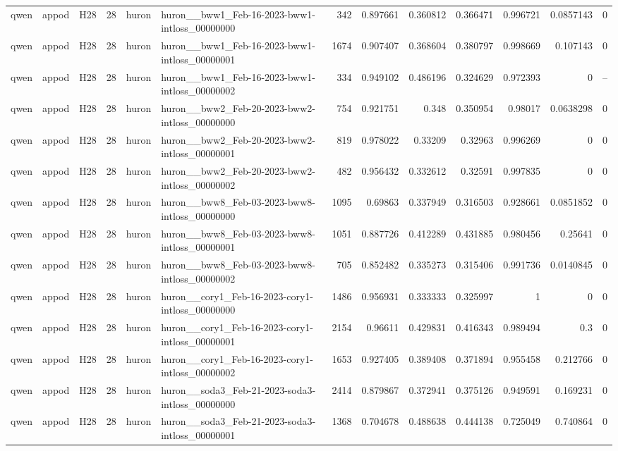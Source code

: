 \begin{longtable}{lllrllrrrrrrr}
qwen & appod & H28 & 28 & huron & huron\_\_bww1\_Feb-16-2023-bww1-intloss\_00000000 & 342 & 0.897661 & 0.360812 & 0.366471 & 0.996721 & 0.0857143 & 0 \\
qwen & appod & H28 & 28 & huron & huron\_\_bww1\_Feb-16-2023-bww1-intloss\_00000001 & 1674 & 0.907407 & 0.368604 & 0.380797 & 0.998669 & 0.107143 & 0 \\
qwen & appod & H28 & 28 & huron & huron\_\_bww1\_Feb-16-2023-bww1-intloss\_00000002 & 334 & 0.949102 & 0.486196 & 0.324629 & 0.972393 & 0 & -- \\
qwen & appod & H28 & 28 & huron & huron\_\_bww2\_Feb-20-2023-bww2-intloss\_00000000 & 754 & 0.921751 & 0.348 & 0.350954 & 0.98017 & 0.0638298 & 0 \\
qwen & appod & H28 & 28 & huron & huron\_\_bww2\_Feb-20-2023-bww2-intloss\_00000001 & 819 & 0.978022 & 0.33209 & 0.32963 & 0.996269 & 0 & 0 \\
qwen & appod & H28 & 28 & huron & huron\_\_bww2\_Feb-20-2023-bww2-intloss\_00000002 & 482 & 0.956432 & 0.332612 & 0.32591 & 0.997835 & 0 & 0 \\
qwen & appod & H28 & 28 & huron & huron\_\_bww8\_Feb-03-2023-bww8-intloss\_00000000 & 1095 & 0.69863 & 0.337949 & 0.316503 & 0.928661 & 0.0851852 & 0 \\
qwen & appod & H28 & 28 & huron & huron\_\_bww8\_Feb-03-2023-bww8-intloss\_00000001 & 1051 & 0.887726 & 0.412289 & 0.431885 & 0.980456 & 0.25641 & 0 \\
qwen & appod & H28 & 28 & huron & huron\_\_bww8\_Feb-03-2023-bww8-intloss\_00000002 & 705 & 0.852482 & 0.335273 & 0.315406 & 0.991736 & 0.0140845 & 0 \\
qwen & appod & H28 & 28 & huron & huron\_\_cory1\_Feb-16-2023-cory1-intloss\_00000000 & 1486 & 0.956931 & 0.333333 & 0.325997 & 1 & 0 & 0 \\
qwen & appod & H28 & 28 & huron & huron\_\_cory1\_Feb-16-2023-cory1-intloss\_00000001 & 2154 & 0.96611 & 0.429831 & 0.416343 & 0.989494 & 0.3 & 0 \\
qwen & appod & H28 & 28 & huron & huron\_\_cory1\_Feb-16-2023-cory1-intloss\_00000002 & 1653 & 0.927405 & 0.389408 & 0.371894 & 0.955458 & 0.212766 & 0 \\
qwen & appod & H28 & 28 & huron & huron\_\_soda3\_Feb-21-2023-soda3-intloss\_00000000 & 2414 & 0.879867 & 0.372941 & 0.375126 & 0.949591 & 0.169231 & 0 \\
qwen & appod & H28 & 28 & huron & huron\_\_soda3\_Feb-21-2023-soda3-intloss\_00000001 & 1368 & 0.704678 & 0.488638 & 0.444138 & 0.725049 & 0.740864 & 0 \\

\end{longtable}
